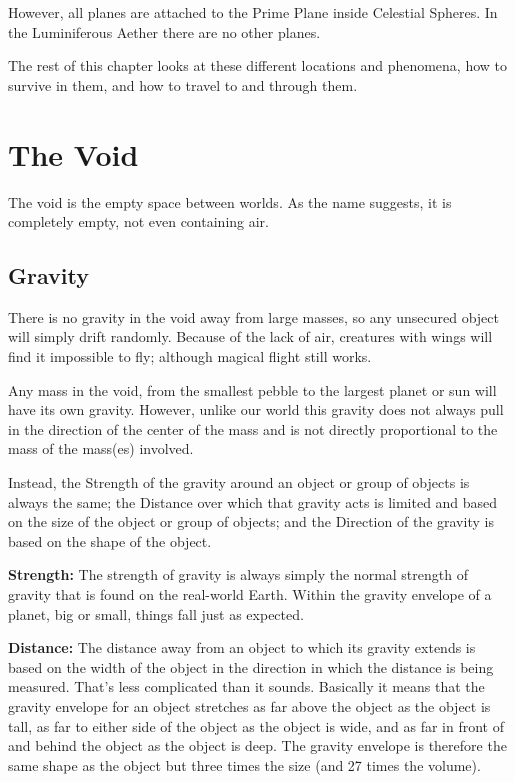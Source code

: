\begin{multicols*}{2}
However, all planes are attached to the Prime Plane inside Celestial Spheres. In the Luminiferous Aether there are no other planes.

The rest of this chapter looks at these different locations and phenomena, how to survive in them, and how to travel to and through them.

\section{The Void}\label{sec:The Void}
The void is the empty space between worlds. As the name suggests, it is completely empty, not even containing air.

\subsection{Gravity}
There is no gravity in the void away from large masses, so any unsecured object will simply drift randomly. Because of the lack of air, creatures with wings will find it impossible to fly; although magical flight still works.

Any mass in the void, from the smallest pebble to the largest planet or sun will have its own gravity. However, unlike our world this gravity does not always pull in the direction of the center of the mass and is not directly proportional to the mass of the mass(es) involved.

Instead, the Strength of the gravity around an object or group of objects is always the same; the Distance over which that gravity acts is limited and based on the size of the object or group of objects; and the Direction of the gravity is based on the shape of the object.

\textbf{Strength:} The strength of gravity is always simply the normal strength of gravity that is found on the real-world Earth. Within the gravity envelope of a planet, big or small, things fall just as expected.

\textbf{Distance:} The distance away from an object to which its gravity extends is based on the width of the object in the direction in which the distance is being measured. That’s less complicated than it sounds. Basically it means that the gravity envelope for an object stretches as far above the object as the object is tall, as far to either side of the object as the object is wide, and as far in front of and behind the object as the object is deep. The gravity envelope is therefore the same shape as the object but three times the size (and 27 times the volume).


\end{multicols*}

